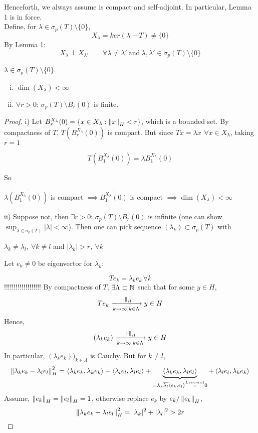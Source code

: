 \documentclass{article}
\begin{document}
Henceforth, we always assume  is compact and self-adjoint. In particular, Lemma 1 is in force.\\
Define, for $\lambda\in\sigma_p(T)\setminus\{0\}$, 
$$X_\lambda=ker(\lambda-T)\neq\{0\}$$
By Lemma 1:
$$X_{\lambda} \perp X_{\lambda '} \qquad \forall \lambda \neq {\lambda '} \ \text{and} \ \lambda , {\lambda '} \in \sigma_p(T)\setminus\{0\}$$
\begin{lemma}[Lemma 2]
	$\lambda\in\sigma_p(T)\setminus\{0\}$.
	\begin{enumerate}[i)]
		\item $\dim (X_\lambda)<\infty$
		\item $\forall r>0$: $\sigma_p(T)\setminus B_r(0)$ is finite.
	\end{enumerate}
\end{lemma}
\begin{proof}
		i) Let $B_r^{X_\lambda}(0)=\{x\in X_\lambda:\left\|{x}\right\|_H<r\}$, which is a bounded set. By compactness of $T$, $T(B_r^{X_\lambda}(0))$ is compact. 
  But since $Tx=\lambda x\, \ \forall x\in X_\lambda$, taking $r=1$
  
  $$T(B_1^{X_\lambda}(0))=\lambda B_1^{X_\lambda}(0)$$
  
  So
  \begin{center}
        $\lambda\overline{(B_1^{X_\lambda}(0))}$ is compact $\implies \overline{B_1^{X_\lambda}(0)}$ is compact $\implies \dim(X_\lambda)<\infty$
  \end{center}
ii) Suppose not, then $\exists r>0$: $\sigma_p(T)\setminus B_r(0)$ is infinite (one can show $\sup_{\lambda\in\sigma_p(T)}|\lambda|<\infty$). 
Then one can pick sequence $(\lambda_k)\subset\sigma_p(T)$ with 
\begin{center}
$\lambda_k\neq\lambda_l, \ \forall k\neq l$ and $|\lambda_k|>r, \ \forall k$    
\end{center}

Let $e_k\neq0$ be eigenvector for $\lambda_k$: 

$$Te_k=\lambda_ke_k\,\forall k$$ 
{\color{red}{Are those normalised eigenvectors?}!!!!!!!!!!!!!!!!!!!}
By compactness of $T$, $\exists\Lambda\subset\mathbb{N}$ such that for some $y\in H$, $$Te_k\xrightarrow[k\to\infty,k\in\Lambda]{\left\|{\cdot}\right\|_H}y\in H$$
		Hence,
		$$(\lambda_ke_k)\xrightarrow[k\to\infty,k\in\Lambda]{\left\|{\cdot}\right\|_H}y\in H$$
		In particular, $(\lambda_ke_k))_{k\in\Lambda}$ is Cauchy. But for $k\neq l$,
		$$\left\|{\lambda_ke_k-\lambda_le_l}\right\|^2_H=
                \left<{\lambda_ke_k},{\lambda_ke_k}\right>
			+\left<{\lambda_le_l},{\lambda_le_l}\right>
			+\underbrace{\left<{\lambda_ke_k},{\lambda_le_l}\right>}_{=\lambda_k\overline{\lambda_l}\left<{e_k},{e_l}\right>\stackrel{Lemma1}{=}0}
			+\left<{\lambda_le_l},{\lambda_ke_k}\right>
		$$
		Assume, $\left\|{e_k}\right\|_H=\left\|{e_l}\right\|_H=1$, otherwise replace $e_k$ by $e_k/\left\|{e_k}\right\|_H$,
		$$
			\left\|{\lambda_ke_k-\lambda_le_l}\right\|^2_H=|\lambda_k|^2+|\lambda_l|^2>2r
		$$
\end{proof}  
\end{document}
